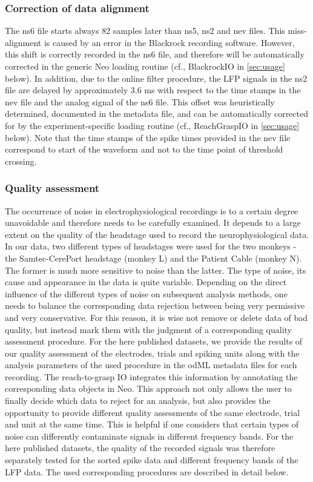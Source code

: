 {\subsubsection{Correction of data alignment}

The ns6 file starts always 82 samples later than ns5, ns2 and nev files. This miss-alignment is caused by an error in the Blackrock recording software. However, this shift is correctly recorded in the ns6 file, and therefore will be automatically corrected in the generic Neo loading routine (cf., BlackrockIO in \cref{sec:usage} below). In addition, due to the online filter procedure, the LFP signals in the ns2 file are delayed by approximately 3.6 ms with respect to the time stamps in the nev file and the analog signal of the ns6 file. This offset was heuristically determined, documented in the metadata file, and can be automatically corrected for by the experiment-specific loading routine (cf., ReachGraspIO in \cref{sec:usage} below). Note that the time stamps of the spike times provided in the nev file correspond to start of the waveform and not to the time point of threshold crossing.

\subsubsection{Quality assessment}

The occurrence of noise in electrophysiological recordings is to a certain degree unavoidable and therefore needs to be carefully examined. It depends to a large extent on the quality of the headstage used to record the neurophysiological data. In our data, two different types of headstages were used for the two monkeys - the Samtec-CerePort headstage (monkey L) and the Patient Cable (monkey N). The former is much more sensitive to noise than the latter. The type of noise, its cause and appearance in the data is quite variable. Depending on the direct influence of the different types of noise on subsequent analysis methods, one needs to balance the corresponding data rejection between being very permissive and very conservative. For this reason, it is wise not remove or delete data of bad quality, but instead mark them with the judgment of a corresponding quality assessment procedure. For the here published datasets, we provide the results of our quality assessment of the electrodes, trials and spiking units along with the analysis parameters of the used procedure in the odML metadata files for each recording. The reach-to-grasp IO integrates this information by annotating the corresponding data objects in Neo. This approach not only allows the user to finally decide which data to reject for an analysis, but also provides the opportunity to provide different quality assessments of the same electrode, trial and unit at the same time. This is helpful if one considers that certain types of noise can differently contaminate signals in different frequency bands. For the here published datasets, the quality of the recorded signals was therefore separately tested for the sorted spike data and different frequency bands of the LFP data. The used corresponding procedures are described in detail below. 

}
